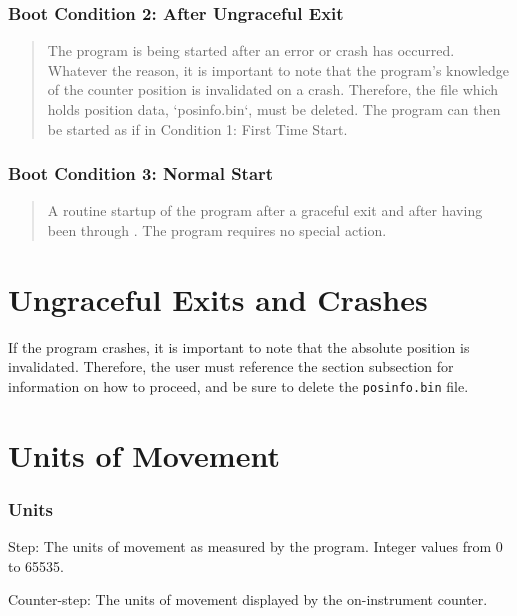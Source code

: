 \documentclass{article}
\begin{document}
\subsubsection{Boot Condition 2: After Ungraceful Exit} \label{subsubsection:bootcon2}
\begin{quote}
    The program is being started after an error or crash has occurred. Whatever the reason, it is important to note that the program’s knowledge of the counter position is invalidated on a crash. Therefore, the file which holds position data, `posinfo.bin`, must be deleted. The program can then be started as if in Condition 1: First Time Start.
\end{quote}

\subsubsection{Boot Condition 3: Normal Start} \label{subsubsection:bootcon3}
\begin{quote} 
    A routine startup of the program after a graceful exit and after having been through . The program requires no special action.
\end{quote}

\section{Ungraceful Exits and Crashes} \label{section:ungracefulexitsandcrashes}

If the program crashes, it is important to note that the absolute position is invalidated. Therefore, the user must reference the section  subsection  for information on how to proceed, and be sure to delete the \verb|posinfo.bin| file.

\section{Units of Movement} \label{section:unitsofmovement}


\subsubsection{Units}

Step: The units of movement as measured by the program. Integer values from 0 to 65535.

Counter-step: The units of movement displayed by the on-instrument counter.
\end{document}

